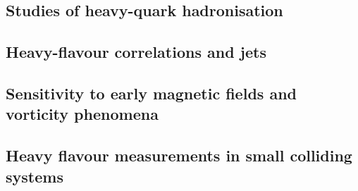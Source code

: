 \documentclass[../report.tex]{subfiles}
\providecommand{\main}{..}
\begin{document}
\subsection{Studies of heavy-quark hadronisation}


\subsection{Heavy-flavour correlations and jets}


\subsection{Sensitivity to early magnetic fields and vorticity phenomena}



\subsection{Heavy flavour measurements in small colliding systems}



% 
\end{document}

